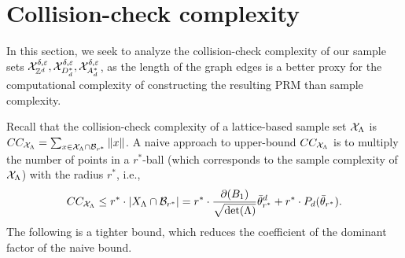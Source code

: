 \section{Collision-check complexity}\label{sec:collision_complexity}
In this section, we seek to analyze the collision-check complexity of our sample sets $\mathcal{X}_{\mathbb{Z}^d}^{\delta,\varepsilon},\mathcal{X}_{D_d^*}^{\delta,\varepsilon},\mathcal{X}_{A_d^*}^{\delta,\varepsilon}$, as the length of the graph edges is a better proxy for the computational complexity of constructing the resulting PRM than sample complexity. 



%




Recall that the collision-check complexity of a lattice-based sample set $\mathcal{X}_\Lambda$  is 
$CC_{\mathcal{X}_\Lambda}=\sum_{x\in \mathcal{X}_\Lambda\cap \mathcal{B}_{r^*}}\|x\|$.
A naive approach to upper-bound $CC_{\mathcal{X}_\Lambda}$ is to multiply the number of points in a $r^*$-ball (which corresponds to the sample complexity of $\mathcal{X}_\Lambda$) with the radius $r^*$, i.e.,
\begin{align}
    CC_{\mathcal{X}_\Lambda}\leq r^*\cdot |X_\Lambda \cap \mathcal{B}_{r^*}|=r^*\cdot \frac{\partial(B_1)}{\sqrt{\det(\Lambda)}}\Bar{\theta}^d_{r^*} + r^*\cdot P_d(\Bar{\theta}_{r^*}). \label{eq:cc_naive}
\end{align}
The following is a tighter bound, which reduces the coefficient of the dominant factor of the naive bound.  

